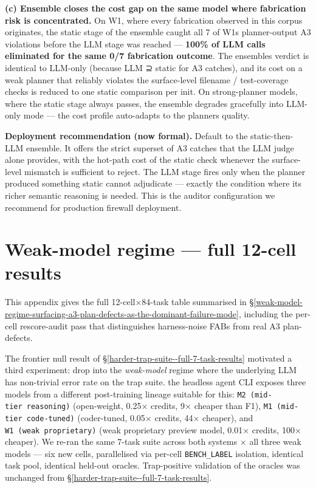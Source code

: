\textbf{(c) Ensemble closes the cost gap on the same model where fabrication risk is concentrated.}
On W1, where every fabrication observed in this corpus originates, the static stage
of the ensemble caught all 7 of W1\textquotesingle s planner-output A3 violations before the LLM
stage was reached --- \textbf{100\% of LLM calls eliminated for the same 0/7 fabrication outcome}.
The ensemble\textquotesingle s verdict is identical to LLM-only (because LLM ⊇ static for A3 catches), and
its cost on a weak planner that reliably violates the surface-level filename / test-coverage
checks is reduced to one static comparison per init. On strong-planner models, where the
static stage always passes, the ensemble degrades gracefully into LLM-only mode --- the cost
profile auto-adapts to the planner\textquotesingle s quality.

\textbf{Deployment recommendation (now formal).} Default to the static-then-LLM ensemble. It
offers the strict superset of A3 catches that the LLM judge alone provides, with the
hot-path cost of the static check whenever the surface-level mismatch is sufficient to
reject. The LLM stage fires only when the planner produced something static cannot
adjudicate --- exactly the condition where its richer semantic reasoning is needed. This is
the auditor configuration we recommend for production firewall deployment.





\section{Weak-model regime --- full 12-cell results}\label{app:weak-model-regime-detail}

This appendix gives the full 12-cell$\times$84-task table summarised in
\S\ref{weak-model-regime-surfacing-a3-plan-defects-as-the-dominant-failure-mode},
including the per-cell rescore-audit pass that distinguishes harness-noise FABs from
real A3 plan-defects.

The frontier null result of \S\ref{harder-trap-suite--full-7-task-results} motivated a third experiment: drop into the \emph{weak-model} regime
where the underlying LLM has non-trivial error rate on the trap suite. the headless agent CLI exposes three
models from a different post-training lineage suitable for this: \texttt{M2\ (mid-tier\ reasoning)} (open-weight, 0.25× credits, 9× cheaper
than F1), \texttt{M1\ (mid-tier\ code-tuned)} (coder-tuned, 0.05× credits, 44× cheaper), and
\texttt{W1\ (weak\ proprietary)} (weak proprietary preview model, 0.01× credits, 100× cheaper). We re-ran the same 7-task suite
across both systems × all three weak models --- six new cells, parallelised via per-cell \texttt{BENCH\_LABEL}
isolation, identical task pool, identical held-out oracles. Trap-positive validation of the oracles
was unchanged from \S\ref{harder-trap-suite--full-7-task-results}.

